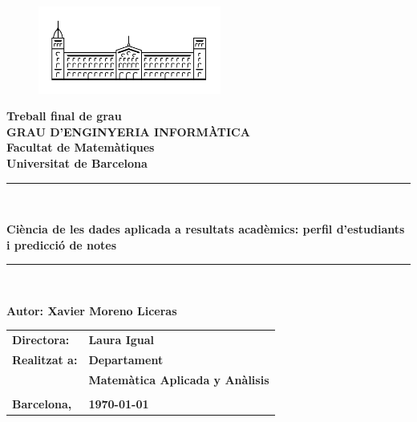 \documentclass[12pt,a4paper,catalan]{article}
\newcommand{\titleTFG}{Ciència de les dades aplicada a resultats acadèmics: perfil d'estudiants i predicció de notes}
\newcommand{\myname}{Xavier Moreno Liceras}
\begin{document}
\thispagestyle{empty}

\begin{titlepage}
\begin{center}
\begin{figure}[h]
\begin{center}
\includegraphics[width=6cm]{img/ub.png}
\end{center}
\end{figure}

\textbf{\LARGE Treball final de grau} \\
\vspace*{.5cm}
\textbf{\LARGE GRAU D'ENGINYERIA INFORMÀTICA } \\
\vspace*{.5cm}
\textbf{\LARGE Facultat de Matemàtiques \\ Universitat de Barcelona} \\
\vspace*{1.5cm}
\rule{\textwidth}{0.1mm}\\
\begin{LARGE}
\textbf{\titleTFG} \\
\end{LARGE}
\rule{\textwidth}{0.1mm}\\

\vspace{1cm}

\begin{flushright}
\textbf{\LARGE Autor: \myname}

\vspace*{2cm}

\renewcommand{\arraystretch}{1.5}
\begin{tabular}{ll}
\textbf{\Large Directora:} & \textbf{\Large Laura Igual } \\
\textbf{\Large Realitzat a:} & \textbf{\Large  Departament   } \\
 & \textbf{\Large Matemàtica Aplicada y Anàlisis} \\
\\
\textbf{\Large Barcelona,} & \textbf{\Large \today }
\end{tabular}

\end{flushright}

\end{center}
\end{titlepage}
\end{document}
